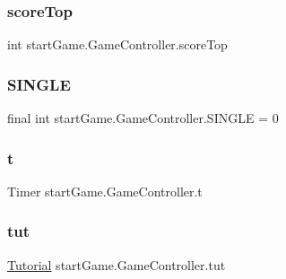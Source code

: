 \subsubsection{\texorpdfstring{score\+Top}{scoreTop}}
{\footnotesize\ttfamily int start\+Game.\+Game\+Controller.\+score\+Top\hspace{0.3cm}{\ttfamily [private]}}

\hypertarget{classstart_game_1_1_game_controller_a38526b0e4bd8fd7078ec988678af462d}{}\label{classstart_game_1_1_game_controller_a38526b0e4bd8fd7078ec988678af462d} 
\subsubsection{\texorpdfstring{S\+I\+N\+G\+LE}{SINGLE}}
{\footnotesize\ttfamily final int start\+Game.\+Game\+Controller.\+S\+I\+N\+G\+LE = 0\hspace{0.3cm}{\ttfamily [private]}}

\hypertarget{classstart_game_1_1_game_controller_af1da0eb8171f6098d28786c5c957fcfd}{}\label{classstart_game_1_1_game_controller_af1da0eb8171f6098d28786c5c957fcfd} 
\subsubsection{\texorpdfstring{t}{t}}
{\footnotesize\ttfamily Timer start\+Game.\+Game\+Controller.\+t\hspace{0.3cm}{\ttfamily [private]}}

\hypertarget{classstart_game_1_1_game_controller_ae807267b0bf97687ef3c7d57e815414e}{}\label{classstart_game_1_1_game_controller_ae807267b0bf97687ef3c7d57e815414e} 
\subsubsection{\texorpdfstring{tut}{tut}}
{\footnotesize\ttfamily \hyperlink{classview_1_1_tutorial}{Tutorial} start\+Game.\+Game\+Controller.\+tut\hspace{0.3cm}{\ttfamily [private]}}

